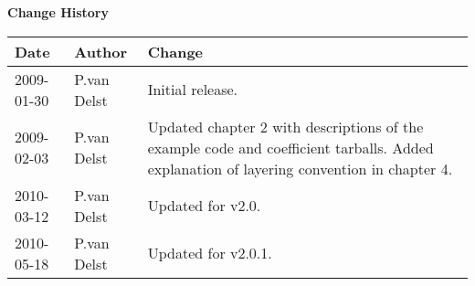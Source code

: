 
\thispagestyle{empty}
\vspace*{10cm}
\begin{center}
  {\sffamily\Large\bfseries Change History}
  \begin{table}[htp]
    \centering
    \begin{tabular}{|p{2cm}|p{3cm}|p{8cm}|}
      \hline
      \sffamily\textbf{Date} & \sffamily\textbf{Author} & \sffamily\textbf{Change}\\
      \hline\hline
      2009-01-30 & P.van Delst & Initial release.\\
      \hline
      2009-02-03 & P.van Delst & Updated chapter 2 with descriptions of the example code and coefficient tarballs. Added explanation of layering convention in chapter 4.\\
      \hline
      2010-03-12 & P.van Delst & Updated for v2.0.\\
      \hline
      2010-05-18 & P.van Delst & Updated for v2.0.1.\\
      \hline
    \end{tabular}
  \end{table}
\end{center}
\clearpage

\setcounter{page}{1}
  \tableofcontents\newpage
  \listoffigures\newpage
  \listoftables\newpage
  
  
\setcounter{page}{1}









\clearpage
{}
{}




\begin{appendix}
  
  
  
%  
\end{appendix}



